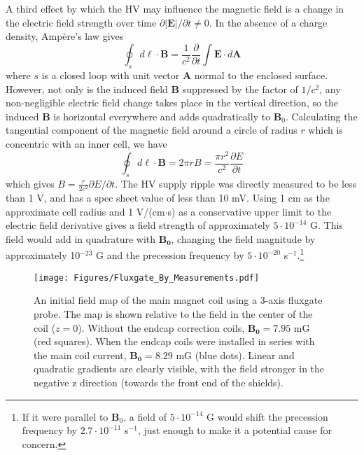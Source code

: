 \documentclass [10pt, twoside] {uwthesis}[2012/04/02]
\begin{document}
A third effect by which the HV may influence the magnetic field is a change in the electric field strength over time $\partial|\mathbf{E}|/\partial t \neq 0$. In the absence of a charge density, Amp\`{e}re's law gives \cite{Jackson}
\begin{equation}
\oint_s d\ell \cdot \mathbf{B} = \dfrac{1}{c^2}\dfrac{\partial}{\partial t} \int \mathbf{E} \cdot d\mathbf{A}
\end{equation}
where $s$ is a closed loop with unit vector $\mathbf{A}$ normal to the enclosed surface. However, not only is the induced field $\mathbf{B}$ suppressed by the factor of $1/c^2$, any non-negligible electric field change takes place in the vertical direction, so the induced $\mathbf{B}$ is horizontal everywhere and adds quadratically to $\mathbf{B}_0$. Calculating the tangential component of the magnetic field around a circle of radius $r$ which is concentric with an inner cell, we have 
\begin{equation}
\oint_s d\ell \cdot \mathbf{B} = 2\pi r B = \dfrac{\pi r^2}{c^2} \dfrac{\partial E}{\partial t}
\end{equation} 
which gives $B = \frac{r}{2c^2} \partial E/\partial t$. The HV supply ripple was directly measured to be less than 1 V, and has a spec sheet value of less than 10 mV. Using 1 cm as the approximate cell radius and 1 V/(cm$\cdot$s) as a conservative upper limit to the electric field derivative gives a field strength of approximately $5 \cdot 10^{-14}$ G. This field would add in quadrature with $\mathbf{B_0}$, changing the field magnitude by approximately 10$^{-23}$ G and the precession frequency by $5 \cdot 10^{-20}$ s$^{-1}$.\footnote{If it were parallel to $\mathbf{B}_0$, a field of $5 \cdot 10^{-14}$ G would shift the precession frequency by $2.7 \cdot 10^{-11}$ s$^{-1}$, just enough to make it a potential cause for concern.} 

\begin{figure}
\begin{center}
\texttt{[image: Figures/Fluxgate\_By\_Measurements.pdf]}
\end{center}
\caption[Field map of $\mathbf{B_y}(z)$]%
{\narrower An initial field map of the main magnet coil using a 3-axis fluxgate probe. The map is shown relative to the field in the center of the coil ($z=0$). Without the endcap correction coils, $\mathbf{B_0} = 7.95$ mG (red squares). When the endcap coils were installed in series with the main coil current, $\mathbf{B_0} = 8.29$ mG (blue dots). Linear and quadratic gradients are clearly visible, with the field stronger in the negative z direction (towards the front end of the shields).}
\label{ByMap2010}
\end{figure}
\end{document}
